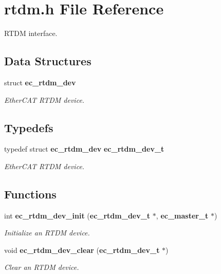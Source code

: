 \section{rtdm.\-h \-File \-Reference}
\label{rtdm_8h}


\-R\-T\-D\-M interface.  


\subsection*{\-Data \-Structures}
\begin{DoxyCompactItemize}
\item 
struct {\bf ec\-\_\-rtdm\-\_\-dev}
\begin{DoxyCompactList}\small\item\em \-Ether\-C\-A\-T \-R\-T\-D\-M device. \end{DoxyCompactList}\end{DoxyCompactItemize}
\subsection*{\-Typedefs}
\begin{DoxyCompactItemize}
\item 
typedef struct {\bf ec\-\_\-rtdm\-\_\-dev} {\bf ec\-\_\-rtdm\-\_\-dev\-\_\-t}\label{rtdm_8h_a251d14e127f7590bdf0a6a59acf07777}

\begin{DoxyCompactList}\small\item\em \-Ether\-C\-A\-T \-R\-T\-D\-M device. \end{DoxyCompactList}\end{DoxyCompactItemize}
\subsection*{\-Functions}
\begin{DoxyCompactItemize}
\item 
int {\bf ec\-\_\-rtdm\-\_\-dev\-\_\-init} ({\bf ec\-\_\-rtdm\-\_\-dev\-\_\-t} $\ast$, {\bf ec\-\_\-master\-\_\-t} $\ast$)
\begin{DoxyCompactList}\small\item\em \-Initialize an \-R\-T\-D\-M device. \end{DoxyCompactList}\item 
void {\bf ec\-\_\-rtdm\-\_\-dev\-\_\-clear} ({\bf ec\-\_\-rtdm\-\_\-dev\-\_\-t} $\ast$)\label{rtdm_8h_a597c8141cb50546873826975c1bc64d5}

\begin{DoxyCompactList}\small\item\em \-Clear an \-R\-T\-D\-M device. \end{DoxyCompactList}\end{DoxyCompactItemize}


